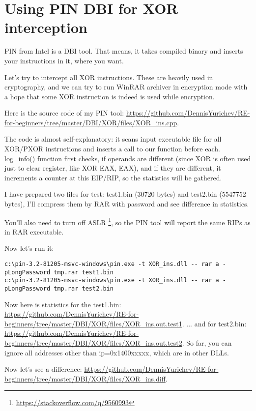 \section{Using PIN DBI for XOR interception}

\newcommand{\GitHubPinXORURL}{https://github.com/DennisYurichev/RE-for-beginners/tree/master/DBI/XOR/files}

PIN from Intel is a \ac{DBI} tool.
That means, it takes compiled binary and inserts your instructions in it, where you want.

Let's try to intercept all XOR instructions.
These are heavily used in cryptography, and we can try to run WinRAR archiver in encryption mode with a hope
that some XOR instruction is indeed is used while encryption.

Here is the source code of my PIN tool: \url{\GitHubPinXORURL/XOR_ins.cpp}.

The code is almost self-explanatory: it scans input executable file for all XOR/PXOR instructions and inserts
a call to our function before each.
log\_info() function first checks, if operands are different (since XOR is often used just to clear register,
like XOR EAX, EAX), and if they are different, it increments a counter at this EIP/RIP, so the statistics will be gathered.

I have prepared two files for test: test1.bin (30720 bytes) and test2.bin
(5547752 bytes), I'll compress them by RAR with password and see difference in statistics.

You'll also need to turn off \ac{ASLR}
\footnote{\url{https://stackoverflow.com/q/9560993}},
so the PIN tool will report the same RIPs as in RAR executable.

Now let's run it:

\begin{lstlisting}
c:\pin-3.2-81205-msvc-windows\pin.exe -t XOR_ins.dll -- rar a -pLongPassword tmp.rar test1.bin
c:\pin-3.2-81205-msvc-windows\pin.exe -t XOR_ins.dll -- rar a -pLongPassword tmp.rar test2.bin
\end{lstlisting}

Now here is statistics for the test1.bin: \\
\url{\GitHubPinXORURL/XOR_ins.out.test1}.
... and for test2.bin: \\
\url{\GitHubPinXORURL/XOR_ins.out.test2}.
So far, you can ignore all addresses other than ip=0x1400xxxxx, which are in other DLLs.

Now let's see a difference: \url{\GitHubPinXORURL/XOR_ins.diff}.

